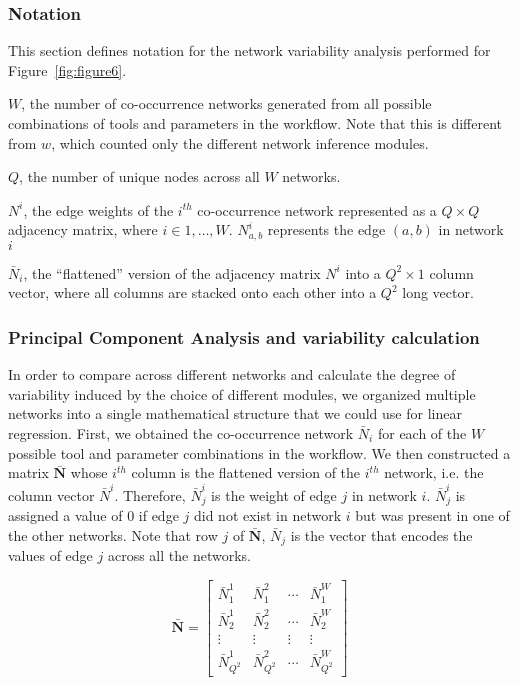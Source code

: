   \subsubsection*{Notation}
  \vspace{-5mm}
  This section defines notation for the network variability analysis performed for Figure~\ref{fig:figure6}.

  $W$, the number of co-occurrence networks generated from all possible combinations of tools and parameters in the workflow.
  Note that this is different from $w$, which counted only the different network inference modules.

  $Q$, the number of unique nodes across all $W$ networks.

  $N^i$, the edge weights of the $i^{th}$ co-occurrence network represented as a $Q \times Q$ adjacency matrix, where $i \in {1, \dots, W}$.
  $N^i_{a,b}$ represents the edge $(a,b)$ in network $i$

  $\bar{N}_i$, the ``flattened'' version of the adjacency matrix $N^i$ into a $Q^2 \times 1$ column vector, where all columns are stacked onto each other into a $Q^2$ long vector.


  \subsubsection*{Principal Component Analysis and variability calculation}
  \vspace{-5mm}
   In order to compare across different networks and calculate the degree of variability induced by the choice of different modules, we organized multiple networks into a single mathematical structure that we could use for linear regression.
   First, we obtained the co-occurrence network $\bar{N}_i$ for each of the $W$ possible tool and parameter combinations in the workflow.
   We then constructed a matrix $\mathbf{\bar{N}}$ whose $i^{th}$ column is the flattened version of the $i^{th}$ network, i.e. the column vector $\bar{N}^i$.
   Therefore, $\bar{N}^i_j$ is the weight of edge $j$ in network $i$.
   $\bar{N}^i_j$ is assigned a value of 0 if edge $j$ did not exist in network $i$ but was present in one of the other networks.
   Note that row $j$ of $\mathbf{\bar{N}}$, $\bar{N}_j$ is the vector that encodes the values of edge $j$ across all the networks.

  \begin{equation*}
   \mathbf{\bar{N}} =
      \begin{bmatrix}
       \bar{N}^1_1 & \bar{N}^2_1 & \cdots  & \bar{N}^{W}_1  \\
       \bar{N}^1_2 & \bar{N}^2_2 & \cdots  & \bar{N}^{W}_2 \\
       \vdots & \vdots & \vdots  & \vdots \\
       \bar{N}^1_{Q^2} & \bar{N}^2_{Q^2} & \cdots  & \bar{N}^{W}_{Q^2}
      \end{bmatrix}
  \end{equation*}

